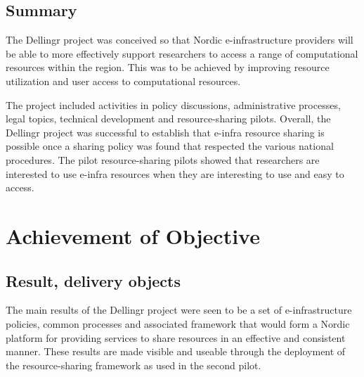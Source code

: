 \documentclass{article}
\newcommand{\dell}{Dellingr\xspace}
\begin{document}
\subsection{Summary}

The \dell project was conceived so that Nordic e-infrastructure providers will be able to more effectively support researchers to access a range of computational resources within the region.
This was to be achieved by improving resource utilization and user access to computational resources.

The project included activities in policy discussions, administrative processes, legal topics, technical development and resource-sharing pilots.
Overall, the \dell project was successful to establish that e-infra resource sharing is possible once a sharing policy was found that
respected the various national procedures.
The pilot resource-sharing pilots showed that researchers are interested to use e-infra resources when they are interesting to use and easy to access.


\section{Achievement of Objective}


\subsection{Result, delivery objects}

The main results of the \dell project were seen to be a set of e-infrastructure policies, common processes and associated framework that would form a Nordic platform for providing services to share resources in an effective and consistent manner.
These results are made visible and useable through the deployment of the resource-sharing framework as used in the second pilot.
\end{document}
